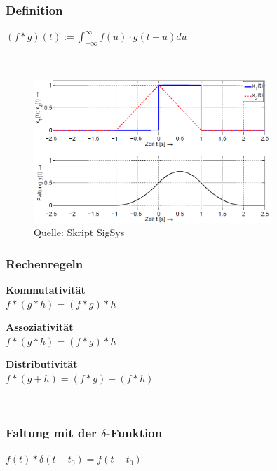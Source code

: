 \subsubsection[Definition]{Definition}
\begin{minipage}{0.4\textwidth}
	\begin{framed}
		\centering
		$(f * g)(t):=\int_{-\infty}^{\infty} f(u) \cdot g(t-u) d u$
	\end{framed}
\end{minipage}\\
%
\begin{figure}[h]
	\centering
	\includegraphics[width=0.8\textwidth]{pics/IntegralTransformation/Faltung.png}
	\caption{Quelle: Skript SigSys}
\end{figure}
%
\subsubsection[Rechenregeln]{Rechenregeln}
	\begin{minipage}{0.33\textwidth}
		\textbf{Kommutativität}\\
		$f *(g * h)=(f * g) * h$
	\end{minipage}
%
	\begin{minipage}{0.33\textwidth}
		\textbf{Assoziativität}\\
		$f *(g * h)=(f * g) * h$
	\end{minipage}
%
	\begin{minipage}{0.33\textwidth}
		\textbf{Distributivität}\\
		$f *(g+h)=(f * g)+(f * h)$
	\end{minipage}\\
%
\subsubsection[Faltung mit der $\delta$-Funktion]{Faltung mit der $\delta$-Funktion}
\begin{minipage}{0.5\textwidth}
	$f(t) * \delta\left(t-t_{0}\right)=f\left(t-t_{0}\right)$
\end{minipage}\\
%
